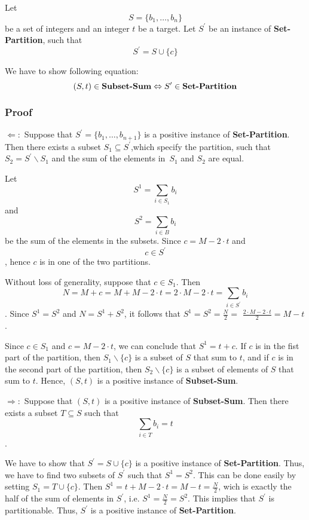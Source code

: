 Let $$S=\{b_{1},\ldots ,b_{n}\}$$ be a set of integers and an integer $t$ be a target.
Let $S^{\prime }$ be an instance of 
\textbf{Set-Partition}, 
such that $$S^{\prime }=S\cup \{c\}$$ 

We have to show following equation:%
\begin{equation}
(S,t)\in 
\mbox{\textbf{Subset-Sum}}%
\Leftrightarrow S^{\prime }\in 
\mbox{\textbf{Set-Partition}}%
\end{equation}

\subsubsection{Proof}
\hfill\newline
$\Leftarrow :$ Suppose that $S^{\prime }=\{b_{1},\ldots ,b_{n+1}\}$ is a
positive instance of \textbf{Set-Partition}. Then there exists a subset 
$S_1\subseteq S^{\prime }$,which specify the partition, such that $S_2=S^{\prime
}\backslash S_1$ and the sum of the elements in\ $S_1$ and $S_2$ are equal.

Let $$S^1=\sum\limits_{i\in S_1}b_{i}$$ and $$S^2=\sum\limits_{i\in B}b_{i}$$
be the sum of the elements in the subsets. Since $c=M-2\cdot t$ 
and $$c\in S^{\prime }$$, hence $c$ is in one of the two partitions.

Without loss of generality, suppose that $c\in S_1$. 
Then $$N=M+c=M+M-2\cdot t=2\cdot M-2\cdot t=\sum \limits_{i\in S^{\prime }} b_{i}$$.
Since $S^1=S^2$ and $N=S^1+S^2$, it follows 
that $S^1=S^2=\frac{N}{2}=$ $\frac{2\cdot M-2\cdot t}{2}=M-t$.

Since $c\in S_1$ and $c=M-2\cdot t$, we can conclude that $S^1=t+c$. If $c$
is in the fist part of the partition, then $S_1\backslash \{c\}$ is a subset
of $S$ that sum to $t$, and if $c$ is in the second part of the partition,
then $S_2\backslash \{c\}$ is a subset of elements of $S$ that sum to $t$.
Hence, $(S,t)$ is a positive instance of \textbf{Subset-Sum}.

$\Rightarrow :$ Suppose that $(S,t)$ is a positive instance of 
\textbf{Subset-Sum}. Then there exists a subset $T\subseteq S$ such that 
$$\sum \limits_{i\in T} b_{i}=t$$.

We have to show that $S^{\prime }=S\cup \{c\}$ is a positive instance of 
\textbf{Set-Partition}. Thus, we have to find two subsets of $S^{\prime }$
such that $S^1=S^2$. This can be done easily by setting $S_1=T\cup \{c\}$.
Then $S^1=t+M-2\cdot t=M-t=\frac{N}{2}$, wich is exactly the half of the
sum of elements in $S^{\prime }$, i.e. $S^1=\frac{N}{2}=S^2$. This
implies that $S^{\prime }$ is partitionable. Thus, $S^{\prime }$ is a
positive instance of \textbf{Set-Partition}.


